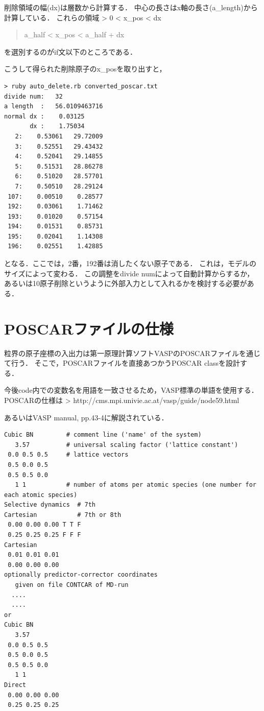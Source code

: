 削除領域の幅(dx)は層数から計算する．
中心の長さはx軸の長さ(a\_length)から計算している． これらの領域
\textgreater{} 0 \textless{} x\_pos \textless{} dx

\begin{quote}
a\_half \textless{} x\_pos \textless{} a\_half + dx
\end{quote}
を選別するのがif文以下のところである．

こうして得られた削除原子のx\_posを取り出すと，

\begin{verbatim}
> ruby auto_delete.rb converted_poscar.txt 
divide num:   32
a length  :   56.0109463716
normal dx :    0.03125
       dx :    1.75034
   2:    0.53061   29.72009
   3:    0.52551   29.43432
   4:    0.52041   29.14855
   5:    0.51531   28.86278
   6:    0.51020   28.57701
   7:    0.50510   28.29124
 107:    0.00510    0.28577
 192:    0.03061    1.71462
 193:    0.01020    0.57154
 194:    0.01531    0.85731
 195:    0.02041    1.14308
 196:    0.02551    1.42885
\end{verbatim}

となる．ここでは，2番，192番は消したくない原子である．
これは，モデルのサイズによって変わる． この調整をdivide
numによって自動計算からするか，
あるいは10原子削除というように外部入力として入れるかを検討する必要がある．

    \section{POSCARファイルの仕様}\label{poscarux30d5ux30a1ux30a4ux30ebux306eux4ed5ux69d8}

粒界の原子座標の入出力は第一原理計算ソフトVASPのPOSCARファイルを通じて行う．
そこで，POSCARファイルを直接あつかうPOSCAR classを設計する．

今後code内での変数名を用語を一致させるため，VASP標準の単語を使用する．
POSCARの仕様は \textgreater{}
http://cms.mpi.univie.ac.at/vasp/guide/node59.html

あるいはVASP manual, pp.43-4に解説されている．

\begin{verbatim}
Cubic BN         # comment line ('name' of the system)
   3.57          # universal scaling factor ('lattice constant')
 0.0 0.5 0.5     # lattice vectors
 0.5 0.0 0.5  
 0.5 0.5 0.0
   1 1           # number of atoms per atomic species (one number for each atomic species)
Selective dynamics  # 7th
Cartesian           # 7th or 8th
 0.00 0.00 0.00 T T F
 0.25 0.25 0.25 F F F
Cartesian
 0.01 0.01 0.01
 0.00 0.00 0.00
optionally predictor-corrector coordinates 
   given on file CONTCAR of MD-run
  ....
  ....
or
Cubic BN
   3.57
 0.0 0.5 0.5
 0.5 0.0 0.5
 0.5 0.5 0.0
   1 1
Direct
 0.00 0.00 0.00 
 0.25 0.25 0.25
\end{verbatim}

